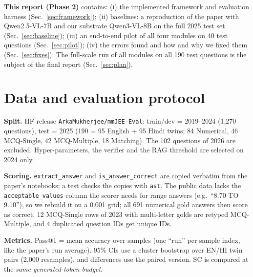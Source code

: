 \documentclass[conference]{IEEEtran}
\begin{document}
\textbf{This report (Phase 2)} contains:
(i) the implemented framework and evaluation harness (Sec.~\ref{sec:framework});
(ii) baselines: a reproduction of the paper with Qwen2.5-VL-7B and our substrate Qwen3-VL-8B on
the full 2025 test set (Sec.~\ref{sec:baseline});
(iii) an end-to-end pilot of all four modules on 40 test questions (Sec.~\ref{sec:pilot});
(iv) the errors found and how and why we fixed them (Sec.~\ref{sec:fixes}).
The full-scale run of all modules on all 190 test questions is the subject of the final report
(Sec.~\ref{sec:plan}).

\section{Data and evaluation protocol}
\textbf{Split.} HF release \texttt{ArkaMukherjee/mmJEE-Eval}: train/dev = 2019--2024 (1{,}270
questions), test = 2025 (190 = 95 English + 95 Hindi twins; 84 Numerical, 46 MCQ-Single, 42
MCQ-Multiple, 18 Matching). The 102 questions of 2026 are excluded. Hyper-parameters, the verifier
and the RAG threshold are selected on 2024 only.

\textbf{Scoring.} \texttt{extract\_answer} and \texttt{is\_answer\_correct} are copied verbatim
from the paper's notebooks; a test checks the copies with \texttt{ast}. The public data lacks the
\texttt{acceptable\_values} column the scorer needs for range answers (e.g.\ ``8.70 TO 9.10''),
so we rebuild it on a 0.001 grid; all 691 numerical gold answers then score as correct. 12
MCQ-Single rows of 2023 with multi-letter golds are retyped MCQ-Multiple, and 4 duplicated
question IDs get unique IDs.

\textbf{Metrics.} Pass@1 = mean accuracy over samples (one ``run'' per sample index, like the
paper's run average). 95\% CIs use a cluster bootstrap over EN/HI twin pairs (2{,}000
resamples), and differences use the paired version. SC is compared at the \emph{same
generated-token budget}.

\end{document}
